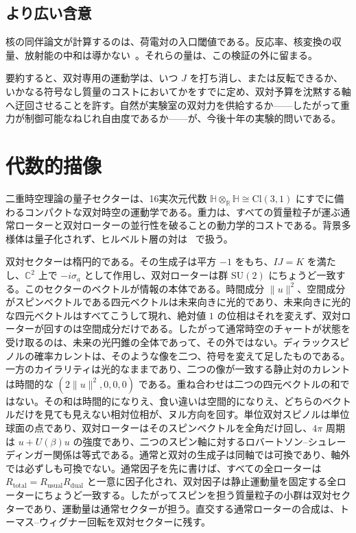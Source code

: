 \documentclass[a4paper]{article}
\begin{document}
\subsection{より広い含意}

核の同伴論文が計算するのは、荷電対の入口閾値である。反応率、核変換の収量、放射能の中和は導かない~\cite{dst-strong}。それらの量は、この検証の外に留まる。

要約すると、双対専用の運動学は、いつ $J$ を打ち消し、または反転できるか、いかなる符号なし質量のコストにおいてかをすでに定め、双対予算を沈黙する軸へ迂回させることを許す。自然が実験室の双対力を供給するか——したがって重力が制御可能なねじれ自由度であるか——が、今後十年の実験的問いである。

\section{代数的描像}
\label{sec:status}

二重時空理論の量子セクターは、16実次元代数 $\mathbb{H}\otimes_{\mathbb{R}}\mathbb{H}\cong\mathrm{Cl}(3,1)$ にすでに備わるコンパクトな双対時空の運動学である。重力は、すべての質量粒子が運ぶ通常ローターと双対ローターの並行性を破ることの動力学的コストである。背景多様体は量子化されず、ヒルベルト層の対は~\cite{dst-d4l} で扱う。

双対セクターは楕円的である。その生成子は平方 $-1$ をもち、$IJ=K$ を満たし、$\mathbb{C}^2$ 上で $-i\sigma_a$ として作用し、双対ローターは群 $\mathrm{SU}(2)$ にちょうど一致する。このセクターのベクトルが情報の本体である。時間成分 $\lVert u\rVert^2$、空間成分がスピンベクトルである四元ベクトルは未来向きに光的であり、未来向きに光的な四元ベクトルはすべてこうして現れ、絶対値 $1$ の位相はそれを変えず、双対ローターが回すのは空間成分だけである。したがって通常時空のチャートが状態を受け取るのは、未来の光円錐の全体であって、その外ではない。ディラックスピノルの確率カレントは、そのような像を二つ、符号を変えて足したものである。一方のカイラリティは光的なままであり、二つの像が一致する静止対のカレントは時間的な \((2\lVert u\rVert^2,0,0,0)\) である。重ね合わせは二つの四元ベクトルの和ではない。その和は時間的になりえ、食い違いは空間的になりえ、どちらのベクトルだけを見ても見えない相対位相が、ヌル方向を回す。単位双対スピノルは単位球面の点であり、双対ローターはそのスピンベクトルを全角だけ回し、$4\pi$ 周期は $u+U(\beta)u$ の強度であり、二つのスピン軸に対するロバートソン--シュレーディンガー関係は等式である。通常と双対の生成子は同軸では可換であり、軸外では必ずしも可換でない。通常因子を先に書けば、すべての全ローターは $R_{\mathrm{total}}=R_{\mathrm{usual}}R_{\mathrm{dual}}$ と一意に因子化され、双対因子は静止運動量を固定する全ローターにちょうど一致する。したがってスピンを担う質量粒子の小群は双対セクターであり、運動量は通常セクターが担う。直交する通常ローターの合成は、トーマス--ウィグナー回転を双対セクターに残す。
\end{document}
